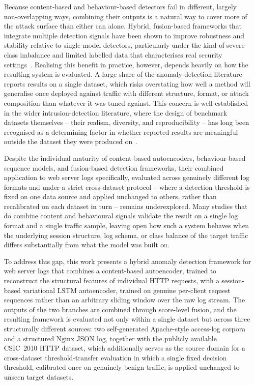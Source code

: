 \documentclass[futureinternet,article,accept,moreauthors]{Definitions/mdpi}
\begin{document}
Because content-based and behaviour-based detectors fail in different, largely non-overlapping ways, combining their outputs is a natural way to cover more of the attack surface than either can alone. Hybrid, fusion-based frameworks that integrate multiple detection signals have been shown to improve robustness and stability relative to single-model detectors, particularly under the kind of severe class imbalance and limited labelled data that characterises real security settings~\cite{kamal2025}. Realising this benefit in practice, however, depends heavily on how the resulting system is evaluated. A large share of the anomaly-detection literature reports results on a single dataset, which risks overstating how well a method will generalise once deployed against traffic with different structure, format, or attack composition than whatever it was tuned against. This concern is well established in the wider intrusion-detection literature, where the design of benchmark datasets themselves -- their realism, diversity, and reproducibility -- has long been recognised as a determining factor in whether reported results are meaningful outside the dataset they were produced on~\cite{shiravi2012}.

Despite the individual maturity of content-based autoencoders, behaviour-based sequence models, and fusion-based detection frameworks, their combined application to web server logs specifically, evaluated across genuinely different log formats and under a strict cross-dataset protocol -- where a detection threshold is fixed on one data source and applied unchanged to others, rather than recalibrated on each dataset in turn -- remains underexplored. Many studies that do combine content and behavioural signals validate the result on a single log format and a single traffic sample, leaving open how such a system behaves when the underlying session structure, log schema, or class balance of the target traffic differs substantially from what the model was built on.

To address this gap, this work presents a hybrid anomaly detection framework for web server logs that combines a content-based autoencoder, trained to reconstruct the structural features of individual HTTP requests, with a session-based variational LSTM autoencoder, trained on genuine per-client request sequences rather than an arbitrary sliding window over the raw log stream. The outputs of the two branches are combined through score-level fusion, and the resulting framework is evaluated not only within a single dataset but across three structurally different sources: two self-generated Apache-style access-log corpora and a structured Nginx JSON log, together with the publicly available CSIC~2010 HTTP dataset, which additionally serves as the source domain for a cross-dataset threshold-transfer evaluation in which a single fixed decision threshold, calibrated once on genuinely benign traffic, is applied unchanged to unseen target datasets.
\end{document}

